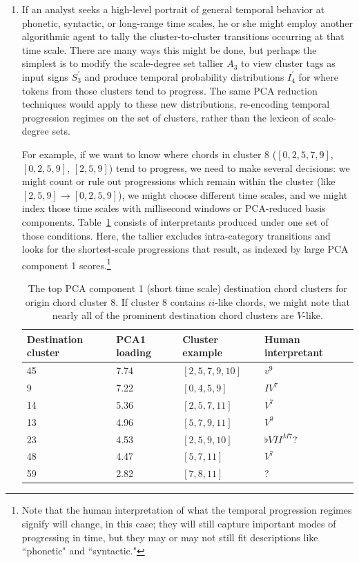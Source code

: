 \begin{enumerate}
	\item If an analyst seeks a high-level portrait of general temporal behavior at phonetic, syntactic, or long-range time scales, he or she might employ another algorithmic agent to tally the cluster-to-cluster transitions occurring at that time scale.  There are many ways this might be done, but perhaps the simplest is to modify the scale-degree set tallier $A_3$ to view cluster tags as input signs $S_3^{\prime}$ and produce temporal probability distributions $I_4^{\prime}$ for where tokens from those clusters tend to progress.  The same PCA reduction techniques would apply to these new distributions, re-encoding temporal progression regimes on the set of clusters, rather than the lexicon of scale-degree sets.
	
For example, if we want to know where chords in cluster 8 ($[0,2,5,7,9]$, $[0,2,5,9]$, $[2,5,9]$) tend to progress, we need to make several decisions: we might count or rule out progressions which remain within the cluster (like $[2,5,9] \rightarrow [0,2,5,9]$), we might choose different time scales, and we might index those time scales with millisecond windows or PCA-reduced basis components.  Table~\ref{8_progs} consists of interpretants produced under one set of those conditions.  Here, the tallier excludes intra-category transitions and looks for the shortest-scale progressions that result, as indexed by large PCA component 1 scores.\footnote{Note that the human interpretation of what the temporal progression regimes signify will change, in this case; they will still capture important modes of progressing in time, but they may or may not still fit descriptions like ``phonetic" and ``syntactic."}
	
	\begin{table}
	\centering
	\caption{The top PCA component 1 (short time scale) destination chord clusters for origin chord cluster 8.  If cluster 8 contains $ii$-like chords, we might note that nearly all of the prominent destination chord clusters are $V$-like.}
	\label{8_progs}
	\begin{tabular}{p{0.75in} | p{0.75in} | >{\raggedright}p{1in} | >{\raggedright\arraybackslash}p{1in} }
	\hline\hline
	Destination cluster & PCA1 loading & Cluster example & Human interpretant\\ \hline
	45 & 7.74 & $[2,5,7,9,10]$ & $v^9$\\ \hline
	9 & 7.22 & $[0,4,5,9]$ & $IV^7$\\ \hline
	14 & 5.36 & $[2,5,7,11]$ & $V^7$\\ \hline
	13 & 4.96 & $[5,7,9,11]$ & $V^9$\\ \hline
	23 & 4.53 & $[2,5,9,10]$ & $\flat VII^{M7}$?\\ \hline
	48 & 4.47 & $[5,7,11]$ & $V^7$\\ \hline
	59 & 2.82 & $[7,8,11]$ & ?\\ \hline
	\end{tabular}
	\end{table}
	

\end{enumerate}
